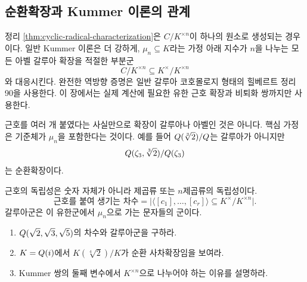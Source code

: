 \subsection{순환확장과 Kummer 이론의 관계}

정리 \ref{thm:cyclic-radical-characterization}은 $C/K^{\times n}$이 하나의 원소로 생성되는 경우이다. 일반 Kummer 이론은 더 강하게, $\mu_n\subseteq K$라는 가정 아래 지수가 $n$을 나누는 모든 아벨 갈루아 확장을 적절한 부분군
\[
  C/K^{\times n}\subseteq K^\times/K^{\times n}
\]
와 대응시킨다. 완전한 역방향 증명은 일반 갈루아 코호몰로지 형태의 힐베르트 정리 90을 사용한다. 이 장에서는 실제 계산에 필요한 유한 근호 확장과 비퇴화 쌍까지만 사용한다.

\begin{pitfall}
근호를 여러 개 붙였다는 사실만으로 확장이 갈루아나 아벨인 것은 아니다. 핵심 가정은 기준체가 $\mu_n$을 포함한다는 것이다. 예를 들어 $Q(\sqrt[3]{2})/Q$는 갈루아가 아니지만
\[
  Q(\zeta_3,\sqrt[3]{2})/Q(\zeta_3)
\]
는 순환확장이다.
\end{pitfall}

\begin{keyidea}
근호의 독립성은 숫자 자체가 아니라 제곱류 또는 $n$제곱류의 독립성이다.
\[
  \boxed{
  \text{근호를 붙여 생기는 차수}
  =\bigl|\langle[c_1],\dots,[c_r]\rangle
  \subseteq K^\times/K^{\times n}\bigr|.}
\]
갈루아군은 이 유한군에서 $\mu_n$으로 가는 문자들의 군이다.
\end{keyidea}

\begin{checkpoint}
\begin{enumerate}[label=(\alph*)]
  \item $Q(\sqrt2,\sqrt3,\sqrt5)$의 차수와 갈루아군을 구하라.
  \item $K=Q(i)$에서 $K(\sqrt[4]{2})/K$가 순환 사차확장임을 보여라.
  \item Kummer 쌍의 둘째 변수에서 $K^{\times n}$으로 나누어야 하는 이유를 설명하라.
\end{enumerate}
\end{checkpoint}
